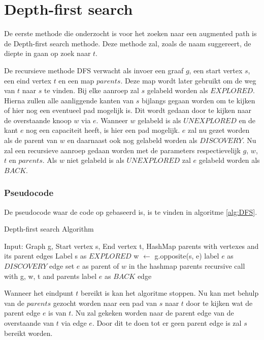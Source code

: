 \chapter{Depth-first search}
\label{chap:depthfirst}

De eerste methode die onderzocht is voor het zoeken naar een augmented path is de Depth-first search methode. Deze methode zal, zoals de naam suggereert, de diepte in gaan op zoek naar $t$. 

De recursieve methode DFS verwacht als invoer een graaf $g$, een start vertex $s$, een eind vertex $t$ en een map $parents$. Deze map wordt later gebruikt om de weg van $t$ naar $s$ te vinden. Bij elke aanroep zal $s$ gelabeld worden als $EXPLORED$. Hierna zullen alle aanliggende kanten van $s$ bijlangs gegaan worden om te kijken of hier nog een eventueel pad mogelijk is. Dit wordt gedaan door te kijken naar de overstaande knoop $w$ via $e$. Wanneer $w$ gelabeld is als $UNEXPLORED$ en de kant $e$ nog een capaciteit heeft, is hier een pad mogelijk. $e$ zal nu gezet worden als de parent van $w$ en daarnaast ook nog gelabeld worden als $DISCOVERY$. Nu zal een recursieve aanroep gedaan worden met de parameters respectievelijk $g$, $w$, $t$ en $parents$.
Als $w$ niet gelabeld is als $UNEXPLORED$ zal $e$ gelabeld worden als $BACK$.

\subsection{Pseudocode}
De pseudocode waar de code op gebaseerd is, is te vinden in algoritme \ref{alg:DFS}.

\begin{algorithm}[h]
\caption{Depth-first search Algorithm}
\label{alg:DFS}
\begin{algorithmic}
\REQUIRE Input: Graph g, Start vertex s, End vertex t, HashMap parents with vertexes and its parent edges
\STATE Label s as $EXPLORED$
\STATE w $\gets$ g.opposite(s, e)
\STATE label $e$ as $DISCOVERY$ edge
\STATE set $e$ as parent of $w$ in the hashmap parents
\STATE recursive call with g, w, t and parents
\ELSE
\STATE label $e$ as $BACK$ edge
\ENDIF
\ENDIF
\ENDFOR
\end{algorithmic}
\end{algorithm}

Wanneer het eindpunt $t$ bereikt is kan het algoritme stoppen. Nu kan met behulp van de $parents$ gezocht worden naar een pad van $s$ naar $t$ door te kijken wat de parent edge $e$ is van $t$. Nu zal gekeken worden naar de parent edge van de overstaande van $t$ via edge $e$. Door dit te doen tot er geen parent edge is zal $s$ bereikt worden.